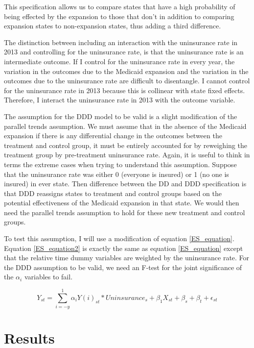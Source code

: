 \documentclass[11pt]{article}
\begin{document}
This specification allows us to compare states that have a high probability of being effected by the expansion to those that don't in addition to comparing expansion states to non-expansion states, thus adding a third difference.  

The distinction between including an interaction with the uninsurance rate in 2013 and controlling for the uninsurance rate, is that the uninsurance rate is an intermediate outcome.  If I control for the uninsurance rate in every year, the variation in the outcomes due to the Medicaid expansion and the variation in the outcomes due to the uninsurance rate are difficult to disentangle.  I cannot control for the uninsurance rate in 2013 because this is collinear with state fixed effects.  Therefore, I interact the uninsurance rate in 2013 with the outcome variable.  

The assumption for the DDD model to be valid is a slight modification of the parallel trends assumption.   We must assume that in the absence of the Medicaid expansion if there is any differential change in the outcomes between the treatment and control group, it must be entirely accounted for by reweighing the treatment group by pre-treatment uninsurance rate.  Again, it is useful to think in terms the extreme cases when trying to understand this assumption.  Suppose that the uninsurance rate was either 0 (everyone is insured) or 1 (no one is insured) in ever state.  Then difference between the DD and DDD specification is that DDD reassigns states to treatment and control groups based on the potential effectiveness of the Medicaid expansion in that state.  We would then need the parallel trends assumption to hold for these new treatment and control groups.  

To test this assumption, I will use a modification of equation \ref{ES_equation}.  Equation \ref{ES_equation2} is exactly the same as equation \ref{ES_equation} except that the relative time dummy variables are weighted by the uninsurance rate.  For the DDD assumption to be valid, we need an F-test for the joint significance of the $\alpha_i$ variables to fail.


\begin{equation}
    Y_{st}=\sum_{i=-y}^1 \alpha_i Y(i)_{st}*Uninsurance_s+ \beta_{1} X_{st} + \beta_s + \beta_t + \epsilon_{st}
     \label{ES_equation2}
\end{equation}


\section{Results}
\end{document}
